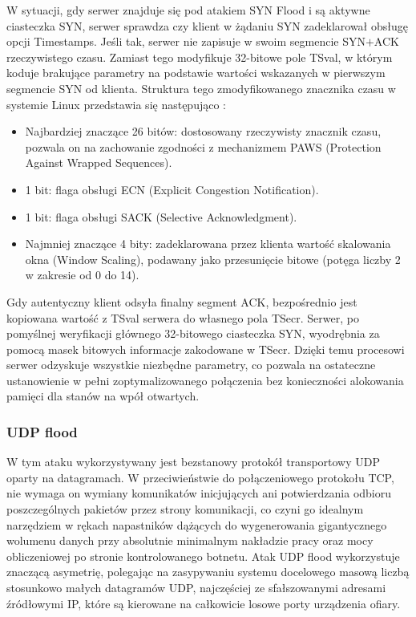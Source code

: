 \documentclass[a4paper,12pt]{article}
\begin{document}
W sytuacji, gdy serwer znajduje się pod atakiem SYN Flood i są aktywne ciasteczka SYN, serwer sprawdza czy klient w żądaniu SYN zadeklarował obsługę opcji Timestamps. Jeśli tak, serwer nie zapisuje w swoim segmencie SYN$+$ACK rzeczywistego czasu. Zamiast tego modyfikuje 32-bitowe pole TSval, w którym koduje brakujące parametry na podstawie wartości wskazanych w pierwszym segmencie SYN od klienta. Struktura tego zmodyfikowanego znacznika czasu w systemie Linux przedstawia się następująco \cite{linux_syncookies}:
\begin{itemize}
\item Najbardziej znaczące 26 bitów: dostosowany rzeczywisty znacznik czasu, pozwala on na zachowanie zgodności z mechanizmem PAWS (Protection Against Wrapped Sequences).
\item 1 bit: flaga obsługi ECN (Explicit Congestion Notification).
\item 1 bit: flaga obsługi SACK (Selective Acknowledgment).
\item Najmniej znaczące 4 bity: zadeklarowana przez klienta wartość skalowania okna (Window Scaling), podawany jako przesunięcie bitowe (potęga liczby 2 w zakresie od 0 do 14).
\end{itemize}
Gdy autentyczny klient odsyła finalny segment ACK, bezpośrednio jest kopiowana wartość z TSval serwera do własnego pola TSecr. Serwer, po pomyślnej weryfikacji głównego 32-bitowego ciasteczka SYN, wyodrębnia za pomocą masek bitowych informacje zakodowane w TSecr. Dzięki temu procesowi serwer odzyskuje wszystkie niezbędne parametry, co pozwala na ostateczne ustanowienie w pełni zoptymalizowanego połączenia bez konieczności alokowania pamięci dla stanów na wpół otwartych.
\subsubsection{UDP flood}
W tym ataku wykorzystywany jest bezstanowy protokół transportowy UDP oparty na datagramach. W przeciwieństwie do połączeniowego protokołu TCP, nie wymaga on wymiany komunikatów inicjujących ani potwierdzania odbioru poszczególnych pakietów przez strony komunikacji, co czyni go idealnym narzędziem w rękach napastników dążących do wygenerowania gigantycznego wolumenu danych przy absolutnie minimalnym nakładzie pracy oraz mocy obliczeniowej po stronie kontrolowanego botnetu. Atak UDP flood wykorzystuje znaczącą asymetrię, polegając na zasypywaniu systemu docelowego masową liczbą stosunkowo małych datagramów UDP, najczęściej ze sfałszowanymi adresami źródłowymi IP, które są kierowane na całkowicie losowe porty urządzenia ofiary.
\end{document}
